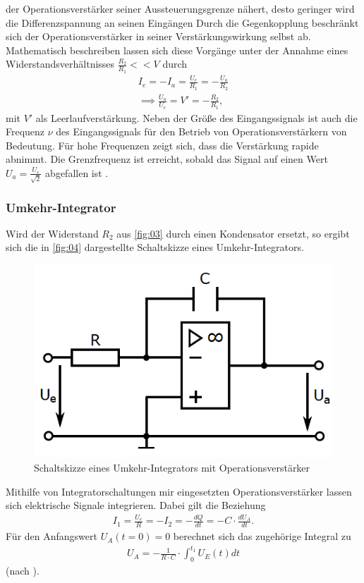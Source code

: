 der Operationsverstärker seiner Aussteuerungsgrenze nähert, desto geringer wird
die Differenzspannung an seinen Eingängen Durch die Gegenkopplung beschränkt sich
der Operationsverstärker in seiner Verstärkungswirkung selbst ab.
Mathematisch beschreiben lassen sich diese Vorgänge unter der Annahme eines
Widerstandsverhältnisses $\frac{R_2}{R_1} << V$ durch
\begin{align}
  I_e = - I_a = \frac{U_e}{R_1} = - \frac{U_a}{R_2} \\
  \implies \frac{U_a}{U_e} = V' = -\frac{R_2}{R_1},
  \label{eqn:05}
\end{align}
\noindent mit $V'$ als Leerlaufverstärkung. Neben der Größe des Eingangssignals
ist auch die Frequenz $\nu$ des Eingangssignals für den Betrieb von
Operationsverstärkern von Bedeutung. Für hohe Frequenzen zeigt sich, dass die
Verstärkung rapide abnimmt. Die Grenzfrequenz ist erreicht, sobald das
Signal auf einen Wert $U_a = \frac{U_e}{\sqrt{2}}$ abgefallen ist \cite{fredenau, sample}.
\subsubsection{Umkehr-Integrator}
\noindent Wird der Widerstand $R_2$ aus \autoref{fig:03} durch einen
Kondensator ersetzt, so ergibt sich die in \autoref{fig:04} dargestellte
Schaltskizze eines Umkehr-Integrators.
\begin{figure}
  \centering
  \includegraphics{ressources/figure_04.png}
  \caption{Schaltskizze eines Umkehr-Integrators mit Operationsverstärker \cite{sample}}
  \label{fig:04}
\end{figure}
\noindent Mithilfe von Integratorschaltungen mir eingesetzten
Operationsverstärker lassen sich elektrische Signale integrieren. Dabei gilt die
Beziehung
\begin{align}
  I_1 = \frac{U_e}{R} = - I_2 = - \frac{dQ}{dt} = - C \cdot \frac{d U_A}{dt}.
  \label{eqn:06}
\end{align}
\noindent Für den Anfangswert $U_A(t=0) = 0$ berechnet sich das zugehörige
Integral zu
\begin{align}
  U_A = - \frac{1}{R \cdot C} \cdot \int_0^{t_1} U_E(t) dt
  \label{eqn:07}
\end{align}
\noindent (nach \cite{muenster}).
